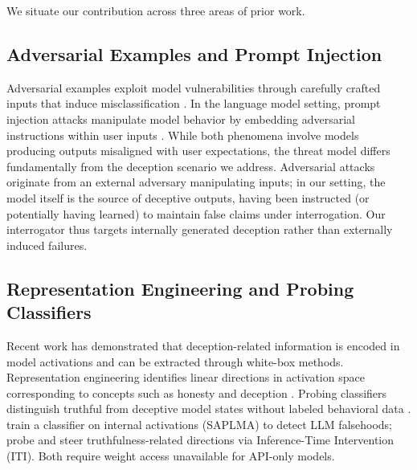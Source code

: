 
\label{sec:related_work}

We situate our contribution across three areas of prior work.

\subsection{Adversarial Examples and Prompt Injection}

Adversarial examples exploit model vulnerabilities through carefully crafted inputs that induce misclassification \cite{goodfellow2014explaining}. In the language model setting, prompt injection attacks manipulate model behavior by embedding adversarial instructions within user inputs \cite{perez2022ignore}. While both phenomena involve models producing outputs misaligned with user expectations, the threat model differs fundamentally from the deception scenario we address. Adversarial attacks originate from an external adversary manipulating inputs; in our setting, the model itself is the source of deceptive outputs, having been instructed (or potentially having learned) to maintain false claims under interrogation. Our interrogator thus targets internally generated deception rather than externally induced failures.

\subsection{Representation Engineering and Probing Classifiers}

Recent work has demonstrated that deception-related information is encoded in model activations and can be extracted through white-box methods. Representation engineering identifies linear directions in activation space corresponding to concepts such as honesty and deception \cite{zou2023representation}. Probing classifiers distinguish truthful from deceptive model states without labeled behavioral data \cite{burns2022discovering}. \citet{azaria2023internal} train a classifier on internal activations (SAPLMA) to detect LLM falsehoods; \citet{li2024inference} probe and steer truthfulness-related directions via Inference-Time Intervention (ITI). Both require weight access unavailable for API-only models.

